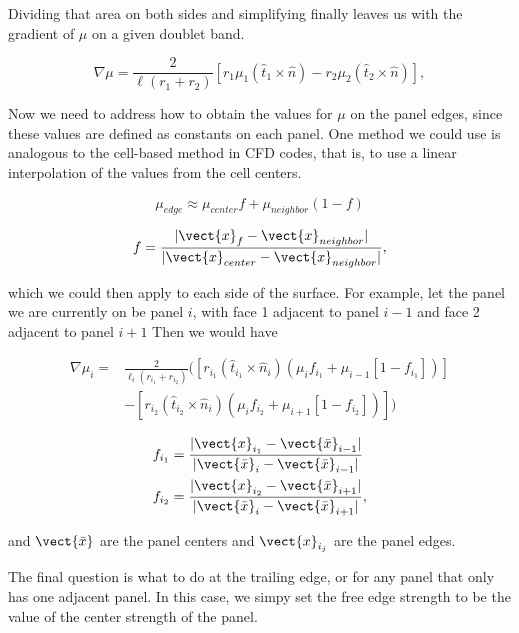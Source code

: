 \noindent Dividing that area on both sides and simplifying finally leaves us with the gradient of \(\mu\) on a given doublet band.

\begin{equation}
    \nabla \mu  = \frac{2}{\ell(r_1+r_2)} \left[ r_1 \mu_1 (\hat{t}_1 \times \hat{n}) - r_2 \mu_2 (\hat{t}_2 \times \hat{n})\right],
\end{equation}

Now we need to address how to obtain the values for \(\mu\) on the panel edges, since these values are defined as constants on each panel.
One method we could use is analogous to the cell-based method in CFD codes, that is, to use a linear interpolation of the values from the cell centers.

\begin{equation}
    \mu_{edge} \approx \mu_{center}f + \mu_{neighbor}(1-f)
\end{equation}

\where

\begin{equation}
    f = \frac{|\vect{x}_f-\vect{x}_{neighbor}|}{|\vect{x}_{center}-\vect{x}_{neighbor}|},
\end{equation}

\noindent which we could then apply to each side of the surface.
For example, let the panel we are currently on be panel \(i\), with face 1 adjacent to panel \(i-1\) and face 2 adjacent to panel \(i+1\)
Then we would have

\begin{equation}
    \begin{split}
        \nabla \mu_i =& \frac{2}{\ell_i(r_{i_1} + r_{i_2})} \bigg( \left[ r_{i_1} (\hat{t}_{i_1} \times \hat{n}_i) (\mu_i f_{i_1} + \mu_{i-1}[1-f_{i_1}]) \right] \\
                      &- \left[  r_{i_2} (\hat{t}_{i_2} \times \hat{n}_i) (\mu_i f_{i_2} + \mu_{i+1}[1-f_{i_2}]) \right] \bigg)
    \end{split}
\end{equation}

\where

\begin{equation}
    \begin{aligned}
        f_{i_1} &= \frac{|\vect{x}_{i_1}-\vect{\bar{x}}_{i-1}|}{|\vect{\bar{x}}_i-\vect{\bar{x}}_{i-1}|} \\
        f_{i_2} &= \frac{|\vect{x}_{i_2}-\vect{\bar{x}}_{i+1}|}{|\vect{\bar{x}}_i-\vect{\bar{x}}_{i+1}|},
    \end{aligned}
\end{equation}

\noindent and \(\vect{\bar{x}}\) are the panel centers and \(\vect{x}_{i_j}\) are the panel edges.

The final question is what to do at the trailing edge, or for any panel that only has one adjacent panel.
In this case, we simpy set the free edge strength to be the value of the center strength of the panel.
